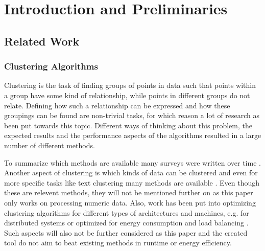 \documentclass[
	a4paper,
	english,
	twoside,
	openright,               
	11pt                            
	]{report}
\begin{document}




\tableofcontents
 \cleardoublepage
%
%
\listoffigures
\cleardoublepage

\listoftables
\cleardoublepage

\cleardoublepage

 \part{Introduction and Preliminaries}
   \setcounter{page}{1}
 


\chapter{Related Work}\label{cha:related_work}
\section{Clustering Algorithms}

Clustering is the task of finding groups of points in data such that points within a group have some kind of relationship, while points in different groups do not relate. Defining how such a relationship can be expressed and how these groupings can be found are non-trivial tasks, for which reason a lot of research as been put towards this topic. Different ways of thinking about this problem, the expected results and the performance aspects of the algorithms resulted in a large number of different methods. 

 To summarize which methods are available many surveys were written over time \cite{7154919,1427769,7414675,surveyclustering}. Another aspect of clustering is which kinds of data can be clustered and even for more specific tasks like text clustering many methods are available \cite{5982288}. Even though these are relevent methods, they will not be mentioned further on as this paper only works on processing numeric data. Also, work has been put into optimizing clustering algorithms for different types of architectures and machines, e.g. for distributed systems \cite{6322592} or optimized for energy consumption and load balancing \cite{7586361}. Such aspects will also not be further considered as this paper and the created tool do not aim to beat existing methods in runtime or energy efficiency.
\end{document}

